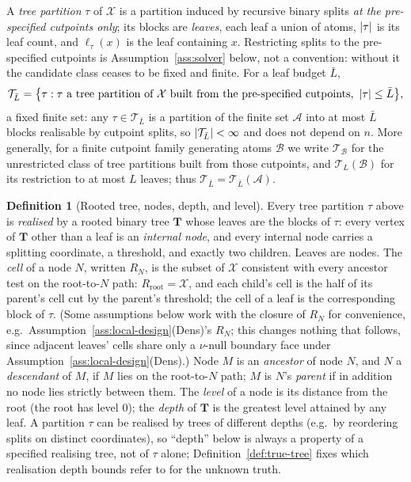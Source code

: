 \documentclass[11pt]{article}
\theoremstyle{plain}
\theoremstyle{definition}
\newtheorem{definition}[theorem]{Definition}
\theoremstyle{remark}
\newcommand{\cX}{\mathcal{X}}
\newcommand{\cA}{\mathcal{A}}
\newcommand{\cB}{\mathcal{B}}
\newcommand{\cT}{\mathcal{T}}
\DeclarePairedDelimiter{\card}{\lvert}{\rvert}
\begin{document}
A \emph{tree partition} $\tau$ of $\cX$ is a partition induced by recursive
binary splits \emph{at the pre-specified cutpoints only}; its blocks are
\emph{leaves}, each leaf a union of atoms, $\card\tau$ is its leaf count, and
$\ell_\tau(x)$ is the leaf containing $x$. Restricting splits to the
pre-specified cutpoints is Assumption~\ref{ass:solver} below, not a
convention: without it the candidate class ceases to be fixed and finite. For
a leaf budget $\bar L$,
\[
  \cT_{\bar L}=\bigl\{\tau:\tau\text{ a tree partition of }\cX\text{ built
  from the pre-specified cutpoints},\ \card\tau\le\bar L\bigr\},
\]
a fixed finite set: any $\tau\in\cT_{\bar L}$ is a partition of the finite set
$\cA$ into at most $\bar L$ blocks realisable by cutpoint splits, so
$\card{\cT_{\bar L}}<\infty$ and does not depend on $n$. More generally, for a
finite cutpoint family generating atoms $\cB$ we write $\cT_\cB$ for the
unrestricted class of tree partitions built from those cutpoints, and
$\cT_{L}(\cB)$ for its restriction to at most $L$ leaves; thus
$\cT_{\bar L}=\cT_{\bar L}(\cA)$.

\begin{definition}[Rooted tree, nodes, depth, and level]\label{def:tree-vocab}
Every tree partition $\tau$ above is \emph{realised} by a rooted binary tree
$\mathbf T$ whose leaves are the blocks of $\tau$: every vertex of
$\mathbf T$ other than a leaf is an \emph{internal node}, and every internal
node carries a splitting coordinate, a threshold, and exactly two children.
Leaves are nodes. The \emph{cell} of a node $N$, written $R_N$, is the subset
of $\cX$ consistent with every ancestor test on the root-to-$N$ path:
$R_{\mathrm{root}}=\cX$, and each child's cell is the half of its parent's
cell cut by the parent's threshold; the cell of a leaf is the corresponding
block of $\tau$. (Some assumptions below work with the closure of $R_N$ for
convenience, e.g.\ Assumption~\ref{ass:local-design}(Dens)'s $R_N$; this
changes nothing that follows, since adjacent leaves' cells share only a
$\nu$-null boundary face under Assumption~\ref{ass:local-design}(Dens).)
Node $M$ is an \emph{ancestor} of node $N$, and $N$ a \emph{descendant} of
$M$, if $M$ lies on the root-to-$N$ path; $M$ is $N$'s \emph{parent} if in
addition no node lies strictly between them. The \emph{level} of a node is
its distance from the root (the root has level $0$); the \emph{depth} of
$\mathbf T$ is the greatest level attained by any leaf. A partition $\tau$ can
be realised by trees of different depths (e.g.\ by reordering splits on
distinct coordinates), so ``depth'' below is always a property of a
specified realising tree, not of $\tau$ alone; Definition~\ref{def:true-tree}
fixes which realisation depth bounds refer to for the unknown truth.
\end{definition}
\end{document}
